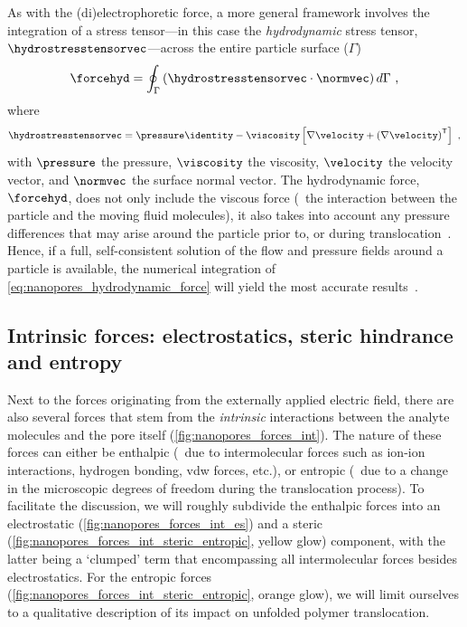As with the (di)electrophoretic force, a more general framework involves the integration of a stress
tensor---in this case the \emph{hydrodynamic} stress tensor, $\hydrostresstensorvec$---across the entire
particle surface ($\Gamma$)~\cite{Ghosal-2019}
%
\begin{equation}\label{eq:nanopores_hydrodynamic_force}
  \forcehyd = \oint_{\Gamma} \left( \hydrostresstensorvec \cdot \normvec \right) d\Gamma
  \text{ ,}
\end{equation}
%
where
%
\begin{align}\label{eq:nanopores_hydrodynamic_stresstensor}
  \hydrostresstensorvec =
  \pressure\identity - \viscosity\left[\nabla\velocity + \left(\nabla\velocity \right)^\mathsf{T}\right]
  \text{ ,}
\end{align}
%
with $\pressure$ the pressure, $\viscosity$ the viscosity, $\velocity$ the velocity vector, and $\normvec$ the
surface normal vector. The hydrodynamic force, $\forcehyd$, does not only include the viscous force (\ie~the
interaction between the particle and the moving fluid molecules), it also takes into account any pressure
differences that may arise around the particle prior to, or during
translocation~\cite{Hoogerheide-2014,Wilson-2018}. Hence, if a full, self-consistent solution of the flow and
pressure fields around a particle is available, the numerical integration of
\cref{eq:nanopores_hydrodynamic_force} will yield the most accurate results~\cite{Galla-2014}.



\subsection{Intrinsic forces: electrostatics, steric hindrance and entropy}
%

Next to the forces originating from the externally applied electric field, there are also several forces that
stem from the \emph{intrinsic} interactions between the analyte molecules and the pore itself
(\cref{fig:nanopores_forces_int}). The nature of these forces can either be enthalpic (\ie~due to
intermolecular forces such as ion-ion interactions, hydrogen bonding, \gls{vdw} forces, etc.), or entropic
(\ie~due to a change in the microscopic degrees of freedom during the translocation process). To facilitate
the discussion, we will roughly subdivide the enthalpic forces into an electrostatic
(\cref{fig:nanopores_forces_int_es}) and a steric (\cref{fig:nanopores_forces_int_steric_entropic}, yellow
glow) component, with the latter being a `clumped' term that encompassing all intermolecular forces besides
electrostatics. For the entropic forces (\cref{fig:nanopores_forces_int_steric_entropic}, orange glow), we
will limit ourselves to a qualitative description of its impact on unfolded polymer translocation.


